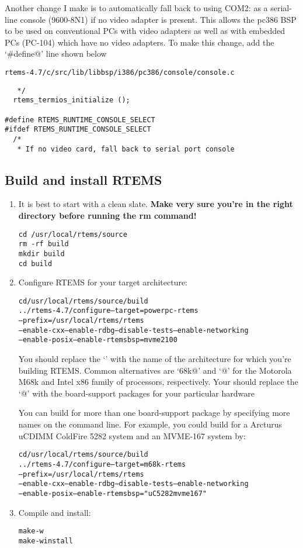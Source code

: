 \documentclass{report}
\newcommand{\rtemsVersion}{4.7}
\begin{document}
Another change I make is to automatically fall back to using COM2: as a
serial-line console (9600-8N1) if no video adapter is present.  This allows
the pc386 BSP to be used on conventional PCs with video adapters as well
as with embedded PCs (PC-104) which have no video adapters.
To make this change, add the `\verb@#define@' line shown below
\begin{alltt}
rtems-\rtemsVersion/c/src/lib/libbsp/i386/pc386/console/console.c
\end{alltt}
\begin{verbatim}
   */
  rtems_termios_initialize ();

#define RTEMS_RUNTIME_CONSOLE_SELECT
#ifdef RTEMS_RUNTIME_CONSOLE_SELECT
  /*
   * If no video card, fall back to serial port console
\end{verbatim}

\subsection{Build and install RTEMS}
\label{RTEMS_BSP_CONFIG}
\begin{enumerate}
\item
It is best to start with a clean slate.  {\bf Make very sure you're in the
right directory before running the rm command!}
\begin{verbatim}
cd /usr/local/rtems/source
rm -rf build
mkdir build
cd build
\end{verbatim}

\item
Configure RTEMS for your target architecture:
\begin{alltt}
cd /usr/local/rtems/source/build
../rtems-\rtemsVersion/configure --target=powerpc-rtems\rtemsToolVersion \verb@\@
   --prefix=/usr/local/rtems/rtems\rtemsToolVersion \verb@\@
  --enable-cxx --enable-rdbg --disable-tests --enable-networking \verb@\@
  --enable-posix --enable-rtemsbsp=mvme2100 \verb@\@
\end{alltt}
You should replace the `\verb@powerpc@' with the name of the architecture
for which you're building RTEMS.  Common alternatives
are `\verb@m68k@' and `@' for
the Motorola M68k and Intel x86 family of processors, respectively.
Your should replace the `@' with the board-support packages
for your particular hardware

You can build for more than one board-support package by specifying
more names on the command line.  For example,
you could build for a Arcturus uCDIMM ColdFire 5282 system and an MVME-167 system
by:
\begin{alltt}
cd /usr/local/rtems/source/build
../rtems-\rtemsVersion/configure --target=m68k-rtems\rtemsToolVersion \verb@\@
      --prefix=/usr/local/rtems/rtems\rtemsToolVersion \verb@\@
      --enable-cxx --enable-rdbg --disable-tests --enable-networking \verb@\@
      --enable-posix --enable-rtemsbsp="uC5282 mvme167" \verb@\@
\end{alltt}

\item
Compile and install:
\begin{alltt}
make -w
make -w install
\end{alltt}
\end{enumerate}
\end{document}
